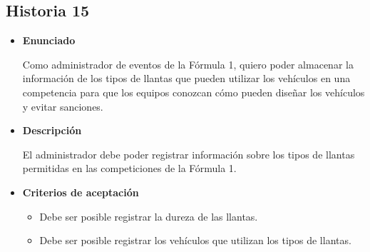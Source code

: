 \documentclass{article}
\begin{document}
	\subsection{Historia 15}
	\begin{itemize}
		
		\item \large{\textbf{Enunciado}}
		\begin{description}
Como administrador de eventos de la Fórmula 1, quiero poder almacenar la información de los tipos de llantas que pueden utilizar los vehículos en una competencia para que los equipos conozcan cómo pueden diseñar los vehículos y evitar sanciones.

		\end{description}
		
		\item \large{\textbf{Descripción}}
		\begin{description}
El administrador debe poder registrar información sobre los tipos de llantas permitidas en las competiciones de la Fórmula 1.

		\end{description}
		
		\item \large{\textbf{Criterios de aceptación}}
		\begin{itemize}
			\item Debe ser posible registrar la dureza de las llantas.
			\item Debe ser posible registrar los vehículos que utilizan los tipos de llantas.
			
		\end{itemize}
		
	\end{itemize}
	
\end{document}
